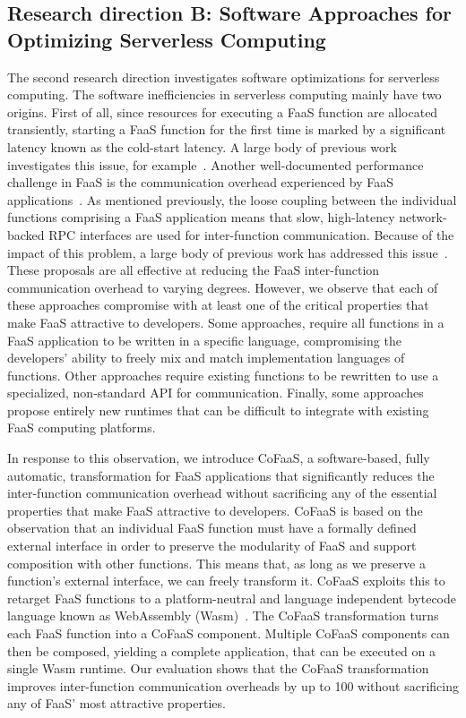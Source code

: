 \documentclass[../main.tex]{subfiles}
\begin{document}
\begin{refsection}
\subsection{Research direction B: Software Approaches for Optimizing Serverless Computing}
\label{sec:pc3}
The second research direction investigates software optimizations for
serverless computing. The software inefficiencies in serverless
computing mainly have two origins. First of all, since resources for
executing a FaaS function are allocated transiently, starting a FaaS
function for the first time is marked by a significant latency known
as the cold-start latency. A large body of previous work investigates
this issue, for
example~\cite{du20_catal,ustiugov21_bench_analy_optim_server_funct_snaps}. Another
well-documented performance challenge in FaaS is the communication
overhead experienced by FaaS
applications~\cite{gan19_open_sourc_bench_suite_micros,stellar}. As
mentioned previously, the loose coupling between the individual
functions comprising a FaaS application means that slow, high-latency
network-backed RPC interfaces are used for inter-function
communication. Because of the impact of this problem, a large body of
previous work has addressed this issue~\cite{kotni21_faast,
  mahgoub22_wisef,
  barcelona-pons19_faas_track,sreekanti20_cloud,shillaker20_faasm,jia21_night}. These
proposals are all effective at reducing the FaaS inter-function
communication overhead to varying degrees. However, we observe that
each of these approaches compromise with at least one of the critical
properties that make FaaS attractive to developers. Some approaches,
require all functions in a FaaS application to be written in a
specific language, compromising the developers' ability to freely mix
and match implementation languages of functions.  Other approaches
require existing functions to be rewritten to use a specialized,
non-standard API for communication. Finally, some approaches propose
entirely new runtimes that can be difficult to integrate with existing
FaaS computing platforms.

In response to this observation, we introduce CoFaaS, a
software-based, fully automatic, transformation for FaaS applications
that significantly reduces the inter-function communication
overhead without sacrificing any of the essential properties that make
FaaS attractive to developers. CoFaaS is based on the observation that
an individual FaaS function must have a formally defined external
interface in order to preserve the modularity of FaaS and support
composition with other functions. This means that, as long as we
preserve a function's external interface, we can freely transform
it. CoFaaS exploits this to retarget FaaS functions to a
platform-neutral and language independent bytecode language known as
WebAssembly (Wasm)~\cite{rossberg22_webas_core_specif}. The CoFaaS
transformation turns each FaaS function into a CoFaaS
component. Multiple CoFaaS components can then be composed, yielding a
complete application, that can be executed on a single Wasm
runtime. Our evaluation shows that the CoFaaS transformation improves
inter-function communication overheads by up to 100\texttimes{}
without sacrificing any of FaaS' most attractive properties.



\end{refsection}
\end{document}
